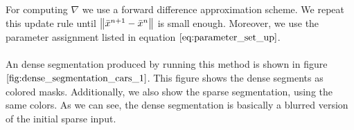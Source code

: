 For computing $\nabla$ we use a forward difference approximation scheme.
We repeat this update rule until $\left\lVert\bar{x}^{n+1} - \bar{x}^{n}\right\rVert$ is small enough. Moreover, we use the parameter assignment listed in equation $\ref{eq:parameter_set_up}$. \\ \\
An dense segmentation produced by running this method is shown in figure $\ref{fig:dense_segmentation_cars_1}$. This figure shows the dense segments as colored masks. Additionally, we also show the sparse segmentation, using the same colors. As we can see, the dense segmentation is basically a blurred version of the initial sparse input. 